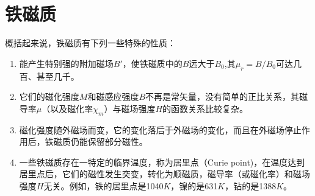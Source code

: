 \section{铁磁质}
概括起来说，铁磁质有下列一些特殊的性质：
\begin{enumerate}
	\item 能产生特别强的附加磁场$B'$，使铁磁质中的$B$远大于$B_0$,其$\mu_r=B/B_0$可达几百、甚至几千。
	\item 它们的磁化强度$M$和磁感应强度$B$不再是常矢量，没有简单的正比关系，其磁导率$\mu$（以及磁化率$\chi_m$）与磁场强度$H$的函数关系比较复杂。
	\item 磁化强度随外磁场而变，它的变化落后于外磁场的变化，而且在外磁场停止作用后，铁磁质仍能保留部分磁性。
	\item 一些铁磁质存在一特定的临界温度，称为居里点（Curie point)，在温度达到居里点后，它们的磁性发生突变，转化为顺磁质，磁导率（或磁化率）和磁场强度$H$无关。例如，铁的居里点是1040$K$，镍的是631$K$，钻的是1388$K$。
\end{enumerate}